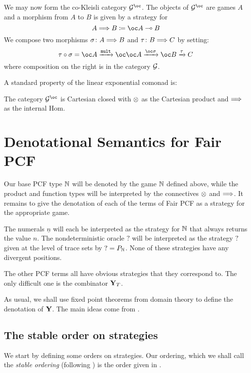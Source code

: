 \documentclass{article}
\begin{document}
We may now form the co-Kleisli category $\G^{\oc}$.  The objects of $\G^{\oc}$ are games $A$ and a morphism from $A$ to $B$ is given by a strategy for
\[
  A \iimpl B \coloneqq \oc A \implies B
  \]
We compose two morphisms $\sigma\colon A\Longrightarrow B$ and $\tau\colon B\Longrightarrow C$ by setting:
\[
  \icomp{\tau}{\sigma} = \oc A \xrightarrow{\mult} \oc \oc A \xrightarrow{\oc \sigma} \oc B \xrightarrow{\tau} C
  \]
where composition on the right is in the category $\mathcal G$.

A standard property of the linear exponential comonad is:

\begin{theorem}
  The category $\G^{\oc}$ is Cartesian closed with $\otimes$ as the Cartesian product and $\Longrightarrow$ as the internal Hom.
\end{theorem}

\section{Denotational Semantics for Fair PCF}

Our base PCF type $\mathbb{N}$ will be denoted by the game $\mathbb{N}$ defined above, while the product and function types will be interpreted by the connectives $\otimes$ and $\Longrightarrow$.  It remains to give the denotation of each of the terms of Fair PCF as a strategy for the appropriate game.

The numerals $\underline{n}$ will each be interpreted as the strategy for $\mathbb{N}$ that always returns the value $n$.  The nondeterministic oracle $?$ will be interpreted as the strategy $?$ given at the level of trace sets by $?=P_{\mathbb{N}}$.  None of these strategies have any divergent positions.

The other PCF terms all have obvious strategies that they correspond to.  The only difficult one is the combinator $\mathbf{Y}_T$.  

As usual, we shall use fixed point theorems from domain theory to define the denotation of $\mathbf{Y}$.  The main ideas come from \cite{LairdOrdinalGames}.

\subsection{The stable order on strategies}

We start by defining some orders on strategies.  Our ordering, which we shall call the \emph{stable ordering} (following \cite{LairdOrdinalGames}) is the order given in \cite{mcCHFiniteND}.
\end{document}
